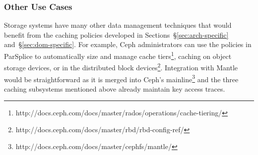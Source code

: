 %

\subsubsection{Other Use Cases}

Storage systems have many other data management techniques that would benefit
from the caching policies developed in Sections~\S\ref{sec:arch-specific}
and~\S\ref{sec:dom-specific}. For example, Ceph administrators can use the
policies in ParSplice to automatically size and manage cache
tiers\footnote{http://docs.ceph.com/docs/master/rados/operations/cache-tiering/},
caching on object storage devices, or in the distributed block
devices\footnote{http://docs.ceph.com/docs/master/rbd/rbd-config-ref/}.
Integration with Mantle would be straightforward as it is merged into Ceph's
mainline\footnote{http://docs.ceph.com/docs/master/cephfs/mantle/} and the
three caching subsystems mentioned above already maintain key access traces. 

